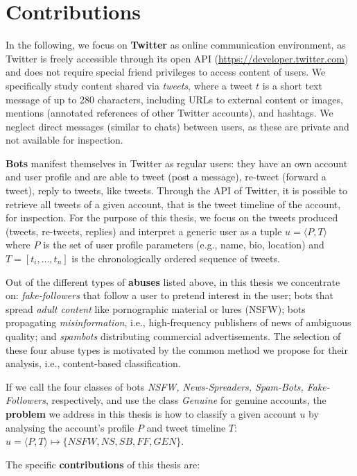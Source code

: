 \section{Contributions}
\label{sec:contributions}
In the following, we focus on \textbf{Twitter} as online communication environment, as Twitter is freely accessible through its open API (\url{https://developer.twitter.com}) and does not require special friend privileges to access content of users. We specifically study content shared via \emph{tweets}, where a tweet $t$ is a short text message of up to 280 characters, including URLs to external content or images, mentions (annotated references of other Twitter accounts), and hashtags. We neglect direct messages (similar to chats) between users, as these are private and not available for inspection. 

\textbf{Bots} manifest themselves in Twitter as regular users: they have an own account and user profile and are able to tweet (post a message), re-tweet (forward a tweet), reply to tweets, like tweets. Through the API of Twitter, it is possible to retrieve all tweets of a given account, that is the tweet timeline of the account, for inspection. For the purpose of this thesis, we focus on the tweets produced (tweets, re-tweets, replies) and interpret a generic user as a tuple $u = \langle P, T \rangle$ where $P$ is the set of 
user profile parameters (e.g., name, bio, location) and $T = [t_i,...,t_n]$ is the chronologically ordered sequence of tweets.

Out of the different types of \textbf{abuses} listed above, in this thesis we concentrate on: \emph{fake-followers} that follow a user to pretend interest in the user; bots that spread \emph{adult content} like pornographic material or lures (NSFW); bots propagating \emph{misinformation}, i.e., high-frequency publishers of news of ambiguous quality; and \emph{spambots} distributing commercial advertisements. The selection of these four abuse types is motivated by the common method we propose for their analysis, i.e., content-based classification.

If we call the four classes of bots \emph{NSFW, News-Spreaders, Spam-Bots, Fake-Followers}, respectively, 
and use the class \emph{Genuine} for genuine accounts, the \textbf{problem} we address in this thesis is how to classify a given account $u$ by analysing the account's profile $P$ and tweet timeline $T$:  
$u = \langle P, T \rangle \mapsto \{NSFW, NS, SB, FF, GEN\}$.

The specific \textbf{contributions} of this thesis are:

